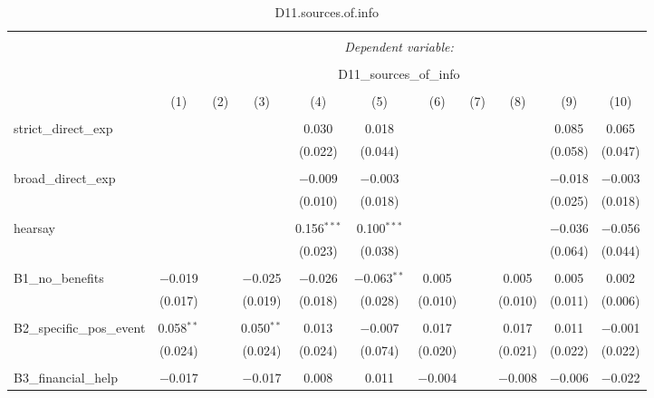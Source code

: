 
\begin{table}[H] \centering 
  \caption{D11.sources.of.info} 
  \label{} 
\tiny 
\begin{tabular}{@{\extracolsep{4pt}}lcccccccccc} 
\\[-1.8ex]\hline 
\hline \\[-1.8ex] 
 & \multicolumn{10}{c}{\textit{Dependent variable:}} \\ 
\cline{2-11} 
\\[-1.8ex] & \multicolumn{10}{c}{D11\_sources\_of\_info} \\ 
\\[-1.8ex] & (1) & (2) & (3) & (4) & (5) & (6) & (7) & (8) & (9) & (10)\\ 
\hline \\[-1.8ex] 
 strict\_direct\_exp &  &  &  & 0.030 & 0.018 &  &  &  & 0.085 & 0.065 \\ 
  &  &  &  & (0.022) & (0.044) &  &  &  & (0.058) & (0.047) \\ 
  & & & & & & & & & & \\ 
 broad\_direct\_exp &  &  &  & $-$0.009 & $-$0.003 &  &  &  & $-$0.018 & $-$0.003 \\ 
  &  &  &  & (0.010) & (0.018) &  &  &  & (0.025) & (0.018) \\ 
  & & & & & & & & & & \\ 
 hearsay &  &  &  & 0.156$^{***}$ & 0.100$^{***}$ &  &  &  & $-$0.036 & $-$0.056 \\ 
  &  &  &  & (0.023) & (0.038) &  &  &  & (0.064) & (0.044) \\ 
  & & & & & & & & & & \\ 
 B1\_no\_benefits & $-$0.019 &  & $-$0.025 & $-$0.026 & $-$0.063$^{**}$ & 0.005 &  & 0.005 & 0.005 & 0.002 \\ 
  & (0.017) &  & (0.019) & (0.018) & (0.028) & (0.010) &  & (0.010) & (0.011) & (0.006) \\ 
  & & & & & & & & & & \\ 
 B2\_specific\_pos\_event & 0.058$^{**}$ &  & 0.050$^{**}$ & 0.013 & $-$0.007 & 0.017 &  & 0.017 & 0.011 & $-$0.001 \\ 
  & (0.024) &  & (0.024) & (0.024) & (0.074) & (0.020) &  & (0.021) & (0.022) & (0.022) \\ 
  & & & & & & & & & & \\ 
 B3\_financial\_help & $-$0.017 &  & $-$0.017 & 0.008 & 0.011 & $-$0.004 &  & $-$0.008 & $-$0.006 & $-$0.022 \\ 

\end{tabular}
\end{table}
